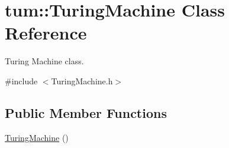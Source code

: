 \hypertarget{classtum_1_1_turing_machine}{\section{tum\-:\-:\-Turing\-Machine \-Class \-Reference}
\label{classtum_1_1_turing_machine}
}


\-Turing \-Machine class.  




{\ttfamily \#include $<$\-Turing\-Machine.\-h$>$}

\subsection*{\-Public \-Member \-Functions}
\begin{DoxyCompactItemize}
\item 
\hypertarget{classtum_1_1_turing_machine_ac84d325a483ddd21a3abd305689fcedc}{\hyperlink{classtum_1_1_turing_machine_ac84d325a483ddd21a3abd305689fcedc}{\-Turing\-Machine} ()}\label{classtum_1_1_turing_machine_ac84d325a483ddd21a3abd305689fcedc}


\end{DoxyCompactItemize}

